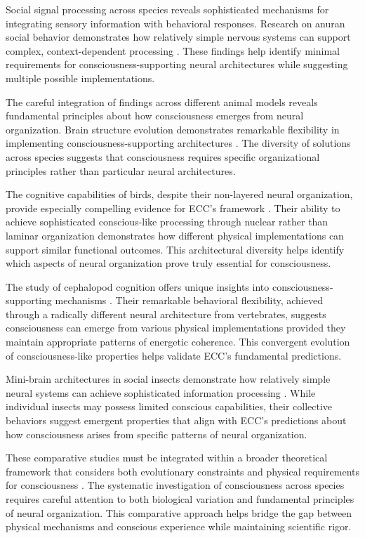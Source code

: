 \begin{refsection}
Social signal processing across species reveals sophisticated mechanisms for integrating sensory information with behavioral responses. Research on anuran social behavior demonstrates how relatively simple nervous systems can support complex, context-dependent processing \cite{Wilczynski2010}. These findings help identify minimal requirements for consciousness-supporting neural architectures while suggesting multiple possible implementations.

The careful integration of findings across different animal models reveals fundamental principles about how consciousness emerges from neural organization. Brain structure evolution demonstrates remarkable flexibility in implementing consciousness-supporting architectures \cite{Northcutt2012}. The diversity of solutions across species suggests that consciousness requires specific organizational principles rather than particular neural architectures.

The cognitive capabilities of birds, despite their non-layered neural organization, provide especially compelling evidence for ECC's framework \cite{Clayton2015}. Their ability to achieve sophisticated conscious-like processing through nuclear rather than laminar organization demonstrates how different physical implementations can support similar functional outcomes. This architectural diversity helps identify which aspects of neural organization prove truly essential for consciousness.

The study of cephalopod cognition offers unique insights into consciousness-supporting mechanisms \cite{Mather2008}. Their remarkable behavioral flexibility, achieved through a radically different neural architecture from vertebrates, suggests consciousness can emerge from various physical implementations provided they maintain appropriate patterns of energetic coherence. This convergent evolution of consciousness-like properties helps validate ECC's fundamental predictions.

Mini-brain architectures in social insects demonstrate how relatively simple neural systems can achieve sophisticated information processing \cite{Menzel2001}. While individual insects may possess limited conscious capabilities, their collective behaviors suggest emergent properties that align with ECC's predictions about how consciousness arises from specific patterns of neural organization.

These comparative studies must be integrated within a broader theoretical framework that considers both evolutionary constraints and physical requirements for consciousness \cite{Roth2005}. The systematic investigation of consciousness across species requires careful attention to both biological variation and fundamental principles of neural organization. This comparative approach helps bridge the gap between physical mechanisms and conscious experience while maintaining scientific rigor.


\end{refsection}
